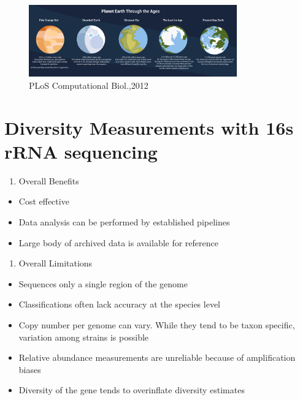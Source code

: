 \documentclass[
]{book}
\providecommand{\tightlist}{%
  \setlength{\itemsep}{0pt}\setlength{\parskip}{0pt}}
\begin{document}
\begin{figure}
\centering
\includegraphics[width=0.8\textwidth,height=\textheight]{./Figures/Planets.png}
\caption{PLoS Computational Biol.,2012}
\end{figure}

\hypertarget{diversity-measurements-with-16s-rrna-sequencing}{%
\section{Diversity Measurements with 16s rRNA sequencing}\label{diversity-measurements-with-16s-rrna-sequencing}}

\begin{enumerate}
\def\labelenumi{\arabic{enumi}.}
\tightlist
\item
  Overall Benefits
\end{enumerate}

\begin{itemize}
\tightlist
\item
  Cost effective
\item
  Data analysis can be performed by established pipelines
\item
  Large body of archived data is available for reference
\end{itemize}

\begin{enumerate}
\def\labelenumi{\arabic{enumi}.}
\setcounter{enumi}{1}
\tightlist
\item
  Overall Limitations
\end{enumerate}

\begin{itemize}
\tightlist
\item
  Sequences only a single region of the genome
\item
  Classifications often lack accuracy at the
  species level
\item
  Copy number per genome can vary. While they
  tend to be taxon specific, variation among
  strains is possible
\item
  Relative abundance measurements are
  unreliable because of amplification biases
\item
  Diversity of the gene tends to overinflate
  diversity estimates
\end{itemize}
\end{document}
